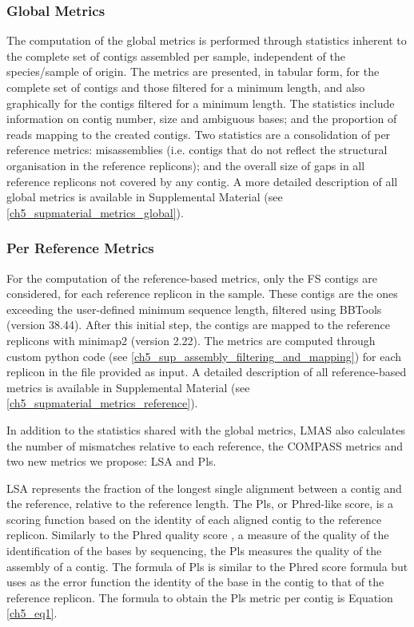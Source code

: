 \subsubsection{Global Metrics} \label{sssec:_chap5_global_metrics} 

The computation of the global metrics is performed through statistics inherent to the complete set of contigs assembled per sample, independent of the species/sample of origin. The metrics are presented, in tabular form, for the complete set of contigs and those filtered for a minimum length, and also graphically for the contigs filtered for a minimum length. The statistics include information on contig number, size and ambiguous bases; and the proportion of reads mapping to the created contigs. Two statistics are a consolidation of per reference metrics: misassemblies (i.e. contigs that do not reflect the structural organisation in the reference replicons); and the overall size of gaps in all reference replicons not covered by any contig. A more detailed description of all global metrics is available in Supplemental Material (see \ref{ch5_supmaterial_metrics_global}). 

\subsubsection{Per Reference Metrics} \label{sssec:_chap5_reference_metrics} 

For the computation of the reference-based metrics, only the \ac{FS} contigs are considered, for each reference replicon in the sample. These contigs are the ones exceeding the user-defined minimum sequence length, filtered using BBTools (version 38.44). After this initial step, the contigs are mapped to the reference replicons with minimap2 \cite{li_minimap2_2018} (version 2.22). The metrics are computed through custom python code (see \ref{ch5_sup_assembly_filtering_and_mapping}) for each replicon in the file provided as input. A detailed description of all reference-based metrics is available in Supplemental Material (see \ref{ch5_supmaterial_metrics_reference}). 

In addition to the statistics shared with the global metrics, LMAS also calculates the number of mismatches relative to each reference, the COMPASS \cite{earl_assemblathon_2011} metrics and two new metrics we propose: \ac{LSA} and \ac{Pls}.

\ac{LSA} represents the fraction of the longest single alignment between a contig and the reference, relative to the reference length. The \ac{Pls}, or Phred-like score, is a scoring function based on the identity of each aligned contig to the reference replicon. Similarly to the Phred quality score \cite{ewing_base-calling_1998}, a measure of the quality of the identification of the bases by sequencing, the \ac{Pls} measures the quality of the assembly of a contig. The formula of \ac{Pls} is similar to the Phred score formula but uses as the error function the identity of the base in the contig to that of the reference replicon. The formula to obtain the \ac{Pls} metric per contig is Equation \ref{ch5_eq1}. 

